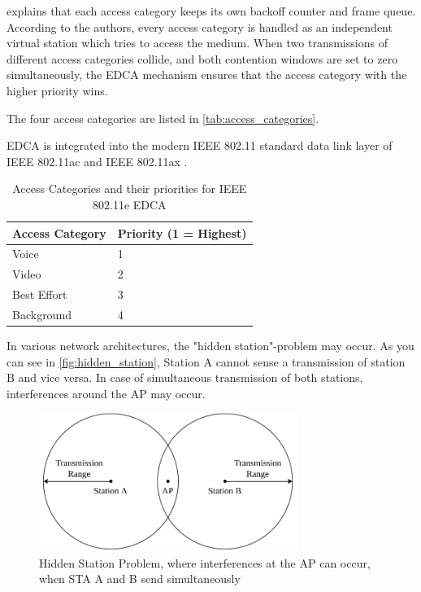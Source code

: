 \textcite{wu_ieee_2006} explains that each access category keeps its own backoff counter and frame queue.
According to the authors, every access category is handled as an independent virtual station which tries to access the medium.
When two transmissions of different access categories collide, and both contention windows are set to zero simultaneously,
the \ac{EDCA} mechanism ensures that the access category with the higher priority wins.

The four access categories are listed in \autoref{tab:access_categories}.

\ac{EDCA} is integrated into the modern IEEE 802.11 standard data link layer of IEEE 802.11ac \cite{ieee_standard_2020}
and IEEE 802.11ax \cite{ieee_standard_2021ax}.

\begin{table}[!ht]
   \centering
   \begin{tabular}{>{\raggedright}p{2.5cm}p{3.2cm}}
      \toprule
      Access Category & Priority (1 = Highest)\\
      \midrule
      Voice & 1 \\
      Video & 2 \\
      Best Effort & 3 \\
      Background & 4 \\
      \bottomrule
   \end{tabular}
   \caption{Access Categories and their priorities for IEEE 802.11e \ac{EDCA} \cite{wu_ieee_2006}}
   \label{tab:access_categories}
\end{table}

In various network architectures, the "hidden station"-problem may occur.
As you can see in \autoref{fig:hidden_station}, Station A cannot sense a transmission of station B and vice versa.
In case of simultaneous transmission of both stations, interferences around the \ac{AP} may occur.
\begin{figure}%
   \centering
   \includegraphics[width=0.75\textwidth]{figures/hidden_station.pdf}
   \caption{Hidden Station Problem, where interferences at the \acf{AP} can occur, when \acf{STA} A and B send simultaneously}%
   \label{fig:hidden_station}%
\end{figure}

